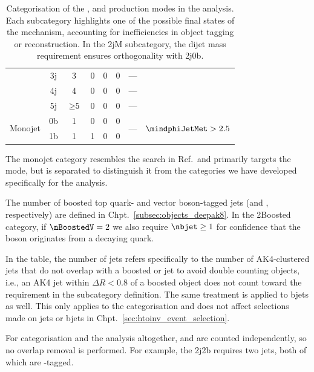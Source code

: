 \begin{table}[htbp]
\begin{tabular}{cccccccc}
        & 3j & 3 & 0 & 0 & 0 & ---\\
        & 4j & 4 & 0 & 0 & 0 & ---\\
        & 5j & $\geq \text{5}$ & 0 & 0 & 0 & ---\\\hline
        \multirow{2}{*}{Monojet}& 0b & 1 & 0 & 0 & 0 & \multirow{2}{*}{---} & \multirow{2}{*}{$\mindphiJetMet > \text{2.5}$}\\ %
        & 1b & 1 & 1 & 0 & 0 &  \\\hline\hline
    \end{tabular}
    \caption[Categorisation of the \ttH, \VH and \ggH production modes in the analysis]{Categorisation of the \ttH, \VH and \ggH production modes in the analysis. Each subcategory highlights one of the possible final states of the mechanism, accounting for inefficiencies in object tagging or reconstruction. In the \ggH 2jM subcategory, the dijet mass requirement ensures orthogonality with \VH 2j0b.}
    \label{tab:htoinv_categories}
\end{table}

The monojet category resembles the search in Ref.~and primarily targets the \ggH mode, but is separated to distinguish it from the categories we have developed specifically for the analysis.

The number of boosted top quark- and vector boson-tagged \glspl{jet} (\nBoostedTop and \nBoostedV, respectively) are defined in Chpt.~\ref{subsec:objects_deepak8}. In the \ttH 2Boosted category, if $\nBoostedV = \text{2}$ we also require $\nbjet \geq \text{1}$ for confidence that the \PVec boson originates from a decaying \Ptop quark.

In the table, the number of \glspl{jet} \njet refers specifically to the number of AK4-clustered \glspl{jet} that do not overlap with a boosted \Ptop or \PVec \gls{jet} to avoid double counting objects, i.e., an AK4 \gls{jet} within $\Delta R < \text{0.8}$ of a boosted object does not count toward the \njet requirement in the subcategory definition. The same treatment is applied to \glspl{bjet} as well. This only applies to the categorisation and does not affect selections made on \glspl{jet} or \glspl{bjet} in Chpt.~\ref{sec:htoinv_event_selection}.

For categorisation and the analysis altogether, \njet and \nbjet are counted independently, so no overlap removal is performed. For example, the \VH 2j2b requires two \glspl{jet}, both of which are \Pbottom-tagged.

